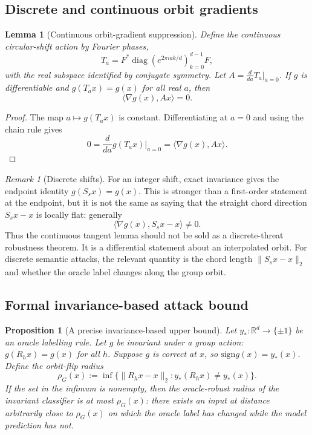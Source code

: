 \documentclass[11pt]{article}
\theoremstyle{plain}
\newtheorem{lemma}{Lemma}
\newtheorem{proposition}{Proposition}
\theoremstyle{definition}
\theoremstyle{remark}
\newtheorem{remark}{Remark}
\newcommand{\R}{\mathbb{R}}
\newcommand{\sign}{\mathrm{sign}}
\begin{document}
\subsection{Discrete and continuous orbit gradients}

\begin{lemma}[Continuous orbit-gradient suppression]\label{lem:continuous-gradient}
Define the continuous circular-shift action by Fourier phases,
\[
T_a=F^*\operatorname{diag}(e^{2\pi iak/d})_{k=0}^{d-1}F,
\]
with the real subspace identified by conjugate symmetry.  Let $A=\frac{d}{da}T_a|_{a=0}$.  If $g$ is differentiable and $g(T_ax)=g(x)$ for all real $a$, then
\[
\langle \nabla g(x),Ax\rangle=0.
\]
\end{lemma}

\begin{proof}
The map $a\mapsto g(T_ax)$ is constant.  Differentiating at $a=0$ and using the chain rule gives
\[
0=\frac{d}{da}g(T_ax)\bigg|_{a=0}=\langle \nabla g(x),Ax\rangle.
\]
\end{proof}

\begin{remark}[Discrete shifts]
For an integer shift, exact invariance gives the endpoint identity $g(S_sx)=g(x)$.  This is stronger than a first-order statement at the endpoint, but it is not the same as saying that the straight chord direction $S_sx-x$ is locally flat: generally
\[
\langle\nabla g(x),S_sx-x\rangle\ne0.
\]
Thus the continuous tangent lemma should not be sold as a discrete-threat robustness theorem.  It is a differential statement about an interpolated orbit.  For discrete semantic attacks, the relevant quantity is the chord length $\|S_sx-x\|_2$ and whether the oracle label changes along the group orbit.
\end{remark}

\subsection{Formal invariance-based attack bound}\label{sec:tramer-formal}

\begin{proposition}[A precise invariance-based upper bound]\label{prop:oracle-flip}
Let $y_*:\R^d\to\{\pm1\}$ be an oracle labelling rule.  Let $g$ be invariant under a group action: $g(R_hx)=g(x)$ for all $h$.  Suppose $g$ is correct at $x$, so $\sign g(x)=y_*(x)$.  Define the orbit-flip radius
\[
\rho_G(x):=\inf\{\|R_hx-x\|_2: y_*(R_hx)\ne y_*(x)\}.
\]
If the set in the infimum is nonempty, then the oracle-robust radius of the invariant classifier is at most $\rho_G(x)$: there exists an input at distance arbitrarily close to $\rho_G(x)$ on which the oracle label has changed while the model prediction has not.
\end{proposition}
\end{document}
